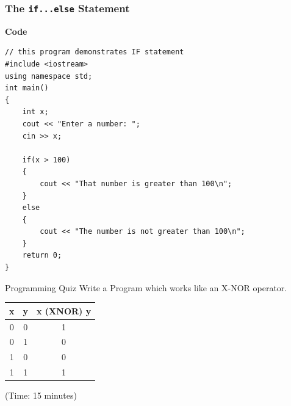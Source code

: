 \documentclass{beamer}
\begin{document}
\begin{frame}[fragile]
    \frametitle{The \texttt{if...else} Statement}
    \textbf{Code}
    \lstset{style=mystyle}
    \begin{lstlisting}
// this program demonstrates IF statement
#include <iostream>
using namespace std;
int main()
{
    int x;
    cout << "Enter a number: ";
    cin >> x;

    if(x > 100)
    {
        cout << "That number is greater than 100\n";
    }
    else
    {
        cout << "The number is not greater than 100\n";
    }
    return 0;
}\end{lstlisting}

\end{frame}

\begin{frame}{Programming Quiz}
Write a Program which works like an X-NOR operator.
    \begin{table}
        \begin{tabular}{c | c | c}
        x & y & x (XNOR) y \\
        \hline \hline
        0 & 0 & 1\\
        0 & 1 & 0\\
        1 & 0 & 0\\
        1 & 1 & 1
        \end{tabular}
    \end{table}(Time: 15 minutes)
	
\end{frame}
\end{document}
